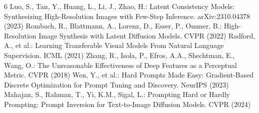 \documentclass[runningheads]{llncs}
\begin{document}
\endgroup

\begingroup
\footnotesize
\begin{thebibliography}{6}
 Luo, S., Tan, Y., Huang, L., Li, J., Zhao, H.: Latent Consistency Models: Synthesizing High-Resolution Images with Few-Step Inference. arXiv:2310.04378 (2023)
 Rombach, R., Blattmann, A., Lorenz, D., Esser, P., Ommer, B.: High-Resolution Image Synthesis with Latent Diffusion Models. CVPR (2022)
 Radford, A., et al.: Learning Transferable Visual Models From Natural Language Supervision. ICML (2021)
 Zhang, R., Isola, P., Efros, A.A., Shechtman, E., Wang, O.: The Unreasonable Effectiveness of Deep Features as a Perceptual Metric. CVPR (2018)
 Wen, Y., et al.: Hard Prompts Made Easy: Gradient-Based Discrete Optimization for Prompt Tuning and Discovery. NeurIPS (2023)
 Mahajan, S., Rahman, T., Yi, K.M., Sigal, L.: Prompting Hard or Hardly Prompting: Prompt Inversion for Text-to-Image Diffusion Models. CVPR (2024)
\end{thebibliography}
\endgroup
\end{document}
